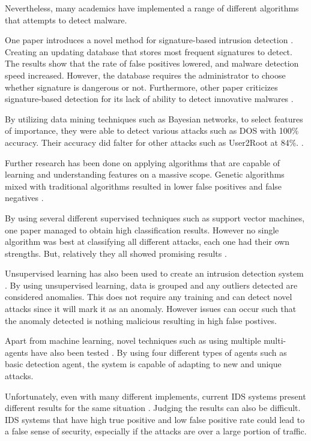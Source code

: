 \documentclass[11pt]{article}
\begin{document}
Nevertheless, many academics have implemented a range of different algorithms that attempts to detect malware. 

One paper introduces a novel method for signature-based intrusion detection \cite{related-work-signature-based}. Creating an updating database that stores most frequent signatures to detect. The results show that the rate of false positives lowered, and malware detection speed increased. However, the database requires the administrator to choose whether signature is dangerous or not. Furthermore, other paper criticizes signature-based detection for its lack of ability to detect innovative malwares \cite{related-work-criticise-signature}. 
 
By utilizing data mining techniques such as Bayesian networks, to select features of importance, they were able to detect various attacks such as DOS with 100\% accuracy. Their accuracy did falter for other attacks such as User2Root at 84\%. \cite{related-work-main-approaches}.

Further research has been done on applying algorithms that are capable of learning and understanding features on a massive scope. Genetic algorithms mixed with traditional algorithms resulted in lower false positives and false negatives \cite{related-work-criticise-signature}. 

By using several different supervised techniques such as support vector machines, one paper managed to obtain high classification results. However no single algorithm was best at classifying all different attacks, each one had their own strengths. But, relatively they all showed promising results \cite{related-work-advantages-and-disadvantages}. 

Unsupervised learning has also been used to create an intrusion detection system \cite{related-work-unsupe}. By using unsupervised learning, data is grouped and any outliers detected are considered anomalies. This does not require any training and can detect novel attacks since it will mark it as an anomaly. However issues can occur such that the anomaly detected is nothing malicious resulting in high false postives.

Apart from machine learning, novel techniques such as using multiple multi-agents have also been tested \cite{related-work-multiagent}. By using four different types of agents such as basic detection agent, the system is capable of adapting to new and unique attacks.

Unfortunately, even with many different implements, current IDS systems present different results for the same situation \cite{related-work-advantages-and-disadvantages}. Judging the results can also be difficult. IDS systems that have high true positive and low false positive rate could lead to a false sense of security, especially if the attacks are over a large portion of traffic.
\end{document}
